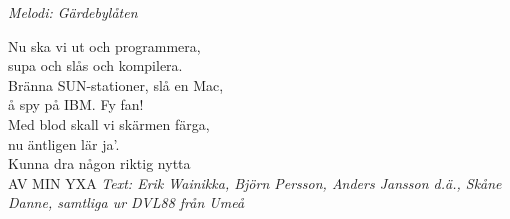 {\footnotesize\textit{Melodi: Gärdebylåten}}\par
\vspace{10pt}
\par
Nu ska vi ut och programmera,\\
supa och slås och kompilera.\\
Bränna SUN-stationer, slå en Mac,\\
å spy på IBM. Fy fan!\\
Med blod skall vi skärmen färga,\\
nu äntligen lär ja'.\\
Kunna dra någon riktig nytta\\
AV MIN YXA
\vspace{10pt}
{\footnotesize\textit{Text: Erik Wainikka, Björn Persson, Anders Jansson d.ä., Skåne Danne, samtliga ur DVL88 från Umeå}}
